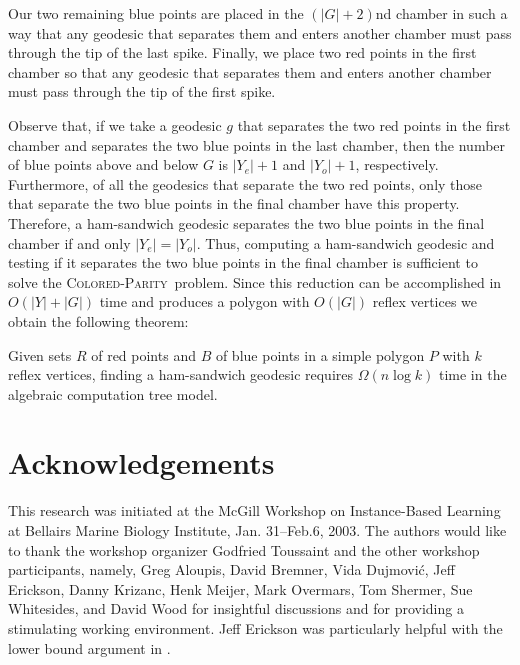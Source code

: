 \documentclass[charterfonts,lotsofwhite]{patmorin}
\newcommand{\parity}{\textsc{Colored-Parity}}
\begin{document}
Our two remaining blue points are placed in the $(|G|+2)$nd chamber in
such a way that any geodesic that separates them and enters another
chamber must pass through the tip of the last spike.  Finally, we
place two red points in the first chamber so that any geodesic that
separates them and enters another chamber must pass through the tip of
the first spike.

Observe that, if we take a geodesic $g$ that separates the two red
points in the first chamber and separates the two blue points in the
last chamber, then the number of blue points above and below $G$ is
$|Y_e|+1$ and $|Y_o|+1$, respectively.  Furthermore, of all the
geodesics that separate the two red points, only those that separate
the two blue points in the final chamber have this property.
Therefore, a ham-sandwich geodesic separates the two blue points in
the final chamber if and only $|Y_e|=|Y_o|$.  Thus, computing a
ham-sandwich geodesic and testing if it separates the two blue points
in the final chamber is sufficient to solve the \parity\ problem.
Since this reduction can be accomplished in $O(|Y|+|G|)$ time and
produces a polygon with $O(|G|)$ reflex vertices we obtain the
following theorem:

\begin{thm}
Given sets $R$ of red points and $B$ of blue points in a simple
polygon $P$ with $k$ reflex vertices, finding a ham-sandwich geodesic
requires $\Omega(n\log k)$ time in the algebraic computation tree
model.
\end{thm}


\section*{Acknowledgements}

This research was initiated at the McGill Workshop on 
Instance-Based Learning at Bellairs Marine Biology Institute, Jan.
31--Feb.6, 2003.  The authors would like to thank the workshop
organizer Godfried Toussaint and the other workshop
participants, namely, 
   Greg Aloupis,
   David Bremner,
   Vida Dujmovi\'c,
   Jeff Erickson,
   Danny Krizanc,
   Henk Meijer,
   Mark Overmars,
   Tom Shermer,
   Sue Whitesides, 
and
   David Wood for insightful
discussions and for providing a stimulating working environment.  Jeff
Erickson was particularly helpful with the lower bound argument in
.



\end{document}
